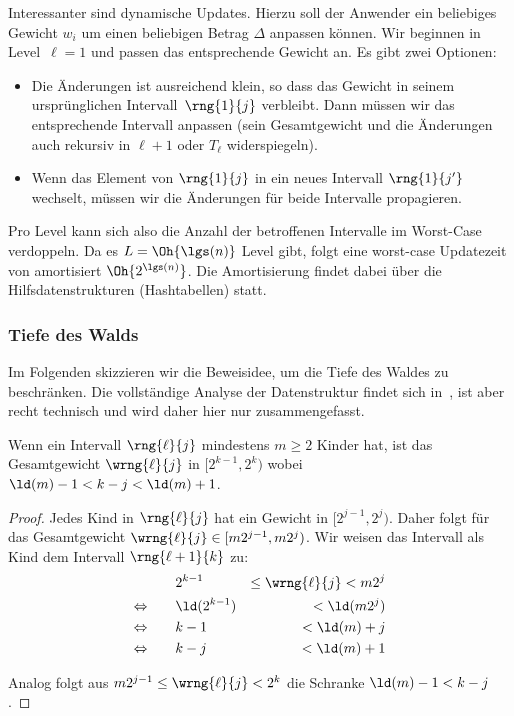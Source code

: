 Interessanter sind dynamische Updates.
Hierzu soll der Anwender ein beliebiges Gewicht $w_i$ um einen beliebigen Betrag $\Delta$ anpassen können.
Wir beginnen in Level~$\ell=1$ und passen das entsprechende Gewicht an.
Es gibt zwei Optionen:
\begin{itemize}
    \item Die Änderungen ist ausreichend klein, so dass das Gewicht in seinem ursprünglichen Intervall~$\rng{1}{j}$ verbleibt.
          Dann müssen wir das entsprechende Intervall anpassen (\dh sein Gesamtgewicht und die Änderungen auch rekursiv in $\ell +1$ oder $T_\ell$ widerspiegeln).


    \item Wenn das Element von $\rng{1}{j}$ in ein neues Intervall $\rng{1}{j'}$ wechselt, müssen wir die Änderungen für beide Intervalle propagieren.
\end{itemize}

Pro Level kann sich also die Anzahl der betroffenen Intervalle im Worst-Case verdoppeln.
Da es $L = \Oh{\lgs(n)}$ Level gibt, folgt eine worst-case Updatezeit von amortisiert $\Oh{2^{\lgs(n)}}$.
Die Amortisierung findet dabei über die Hilfsdatenstrukturen (\zB Hashtabellen) statt.

\subsubsection{Tiefe des Walds}
Im Folgenden skizzieren wir die Beweisidee, um die Tiefe des Waldes zu beschränken.
Die vollständige Analyse der Datenstruktur findet sich in~\cite{DBLP:journals/mst/MatiasVN03}, ist aber recht technisch und wird daher hier nur zusammengefasst.

\begin{lemma}\label{lem:nachfolger_intervall}
    Wenn ein Intervall $\rng{\ell}{j}$ mindestens $m \ge 2$ Kinder hat,
    ist das Gesamtgewicht $\wrng{\ell}{j}$ in $[2^{k-1}, 2^k)$ wobei $\ld(m) - 1 < k - j < \ld(m) + 1$.
\end{lemma}
\begin{proof}
    Jedes Kind in $\rng{\ell}{j}$ hat ein Gewicht in $[2^{j-1}, 2^j)$.
    Daher folgt für das Gesamtgewicht $\wrng{\ell}{j} \in [m2^{j-1}, m2^j)$.
    Wir weisen das Intervall als Kind dem Intervall $\rng{\ell+1}{k}$ zu:
    \begin{align}
                               & 2^{k-1}      & \le \wrng{\ell}{j} < m2^j \\
        \Leftrightarrow \qquad & \ld(2^{k-1}) & < \ld(m2^{j})             \\
        \Leftrightarrow \qquad & k - 1        & < \ld(m) + j              \\
        \Leftrightarrow \qquad & k - j        & < \ld(m) + 1
    \end{align}

    \noindent
    Analog folgt aus $m2^{j-1} \le \wrng{\ell}{j} < 2^k$ die Schranke $\ld(m) - 1 < k - j$.
\end{proof}


